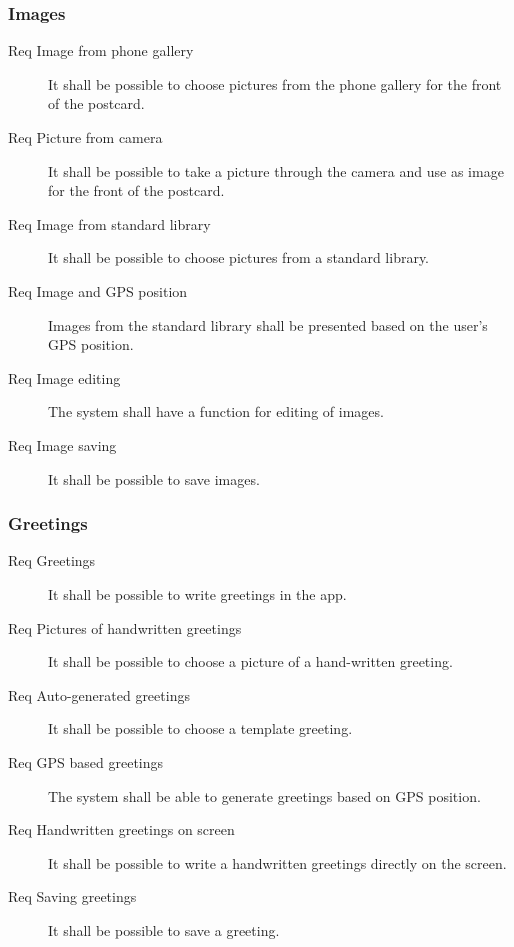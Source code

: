 \documentclass[10pt,a4paper]{article}
\begin{document}
\subsubsection{Images} 
\begin {description}
\item [Req  Image from phone gallery]It shall be possible to choose pictures from the phone gallery for the front of the postcard.
\item [Req  Picture from camera] It shall be possible to take a picture through the camera and use as image for the front of the postcard.
\item [Req  Image from standard library] It shall be possible to choose pictures from a standard library.
\item [Req  Image and GPS position] Images from the standard library shall be presented based on the user's GPS position.
\item [Req  Image editing] The system shall have a function for editing of images.
\item [Req  Image saving] It shall be possible to save images.
\end{description}

\subsubsection{Greetings}
\begin{description}
\item [Req  Greetings] It shall be possible to write greetings in the app.
\item [Req  Pictures of handwritten greetings] It shall be possible to choose a picture of a hand-written greeting.
\item [Req  Auto-generated greetings] It shall be possible to choose a template greeting.
\item [Req  GPS based greetings] The system shall be able to generate greetings based on GPS position.
\item [Req  Handwritten greetings on screen] It shall be possible to write a handwritten greetings directly on the screen.
\item [Req  Saving greetings] It shall be possible to save a greeting.
\end{description}
\end{document}
